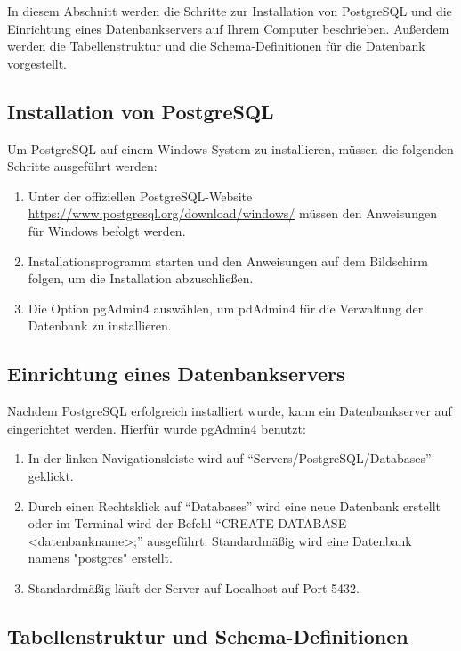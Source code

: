 
In diesem Abschnitt werden die Schritte zur Installation von PostgreSQL und die Einrichtung eines Datenbankservers auf Ihrem Computer beschrieben. Außerdem werden die Tabellenstruktur und die Schema-Definitionen für die Datenbank vorgestellt.

\subsection{Installation von PostgreSQL}

Um PostgreSQL auf einem Windows-System zu installieren, müssen die folgenden Schritte ausgeführt werden:

\begin{enumerate}
\item Unter der offiziellen PostgreSQL-Website \url{https://www.postgresql.org/download/windows/} müssen den Anweisungen für Windows befolgt werden.
\item Installationsprogramm starten und den Anweisungen auf dem Bildschirm folgen, um die Installation abzuschließen.
\item Die Option pgAdmin4 auswählen, um pdAdmin4 für die Verwaltung der Datenbank zu installieren.
\end{enumerate}

\subsection{Einrichtung eines Datenbankservers}

Nachdem PostgreSQL erfolgreich installiert wurde, kann ein Datenbankserver auf eingerichtet werden. Hierfür wurde pgAdmin4 benutzt:

\begin{enumerate}
\item In der linken Navigationsleiste wird auf \enquote{Servers/PostgreSQL/Databases} geklickt.
\item Durch einen Rechtsklick auf \enquote{Databases} wird eine neue Datenbank erstellt oder im Terminal wird der Befehl \enquote{CREATE DATABASE <datenbankname>;} ausgeführt. Standardmäßig wird eine Datenbank namens "postgres" erstellt.
\item Standardmäßig läuft der Server auf Localhost auf Port 5432.
\end{enumerate}

\subsection{Tabellenstruktur und Schema-Definitionen}

